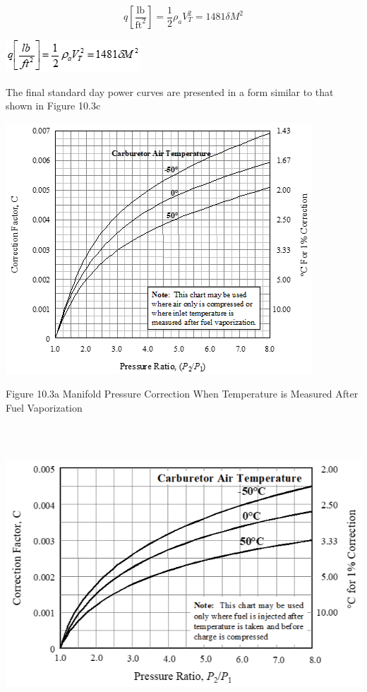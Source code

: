 \documentclass[
]{book}
\begin{document}
\[
q \left[ \frac{\text{lb}}{\text{ft}^2} \right] = \frac{1}{2} \rho_a V_T^2 = 1481 \delta M^2
\]

\includegraphics[width=1.98958in,height=0.48958in]{media/10/image21.png}

The final standard day power curves are presented in a form similar to that shown in Figure 10.3c

\includegraphics[width=4.52014in,height=3.70764in]{media/10/image22.png}

Figure 10.3a Manifold Pressure Correction When Temperature is Measured After Fuel Vaporization

\includegraphics[width=6.87431in,height=4.37431in]{media/10/image23.png}
\end{document}

